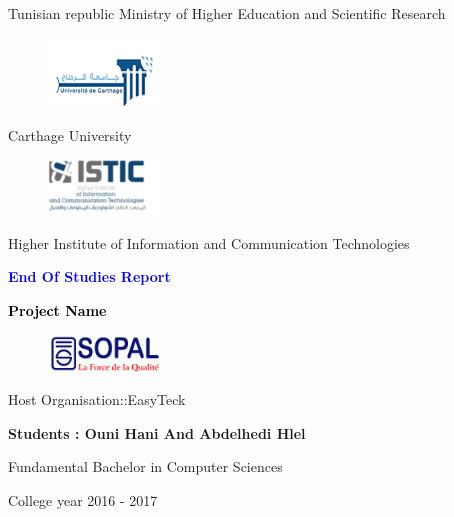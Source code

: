 
\begin{titlepage}



\begin{center}
Tunisian republic
Ministry of Higher Education and Scientific Research

\begin{figure}[!ht]
\centering
\includegraphics [width =3cm]{ucar.png}
\end{figure}

Carthage University

\vspace{1cm}
\begin{figure}[!ht]
\centering
\includegraphics[width =3cm]{ISTIC.png}
\end{figure}
Higher Institute of Information and Communication Technologies

\vspace*{1cm}


\textcolor{blue}{\textbf{\Large{End Of Studies Report}}}

\vspace*{0.5cm}
\textcolor{black}{\textbf{\Huge{Project Name}}}

\vspace*{0.5cm}
\begin{figure}[!ht]
\centering
\includegraphics [width =3cm]{Sopal.png}
\end{figure}
Host Organisation::EasyTeck


\vspace*{1cm}

\textbf{\large{Students : Ouni Hani And Abdelhedi Hlel}}

\footnotesize{Fundamental Bachelor in Computer Sciences}

 
\end{center}


\begin{center}  
\vspace*{1cm}  
College year 2016 - 2017
\end{center}

\end{titlepage}
